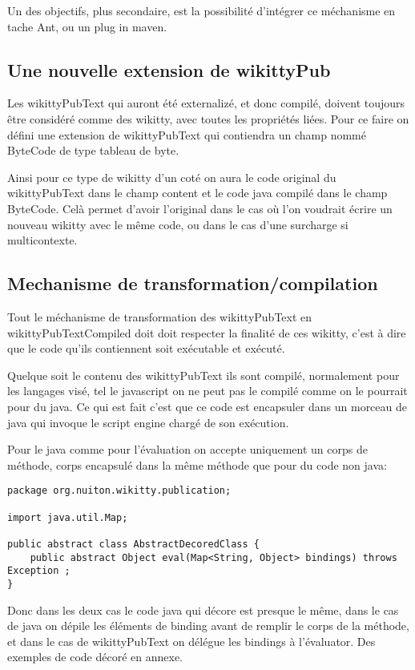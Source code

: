 Un des objectifs, plus secondaire, est la possibilité d'intégrer ce méchanisme
en tache Ant, ou un plug in maven.

\subsection{Une nouvelle extension de wikittyPub}

Les wikittyPubText qui auront été externalizé, et donc compilé, doivent toujours 
être considéré comme des wikitty, avec toutes les propriétés liées. Pour ce 
faire on défini une extension de wikittyPubText qui contiendra un champ nommé 
ByteCode de type tableau de byte.

Ainsi pour ce type de wikitty d'un coté on aura le code original du 
wikittyPubText dans le champ content et le code java compilé dans le champ
ByteCode. Celà permet d'avoir l'original dans le cas où l'on voudrait écrire
un nouveau wikitty avec le même code, ou dans le cas d'une surcharge si 
multicontexte.

\subsection{Mechanisme de transformation/compilation}

Tout le méchanisme de transformation des wikittyPubText en wikittyPubTextCompiled
doit doit respecter la finalité de ces wikitty, c'est à dire que le code qu'ils
contiennent soit exécutable et exécuté. 

Quelque soit le contenu des wikittyPubText ils sont compilé, normalement pour les
langages visé, tel le javascript on ne peut pas le compilé comme on le pourrait 
pour du java. Ce qui est fait c'est que ce code est encapsuler dans un morceau
de java qui invoque le script engine chargé de son exécution. 

Pour le java comme pour l'évaluation on accepte uniquement un corps de méthode,
corps encapsulé dans la même méthode que pour du code non java:


\begin{lstlisting}
package org.nuiton.wikitty.publication;

import java.util.Map;

public abstract class AbstractDecoredClass {
    public abstract Object eval(Map<String, Object> bindings) throws Exception ;
}
\end{lstlisting}

Donc dans les deux cas le code java qui décore est presque le même, dans le 
cas de java on dépile les éléments de binding avant de remplir le corps de la 
méthode, et dans le cas de wikittyPubText on délégue les bindings à l'évaluator.
Des exemples de code décoré en annexe.

